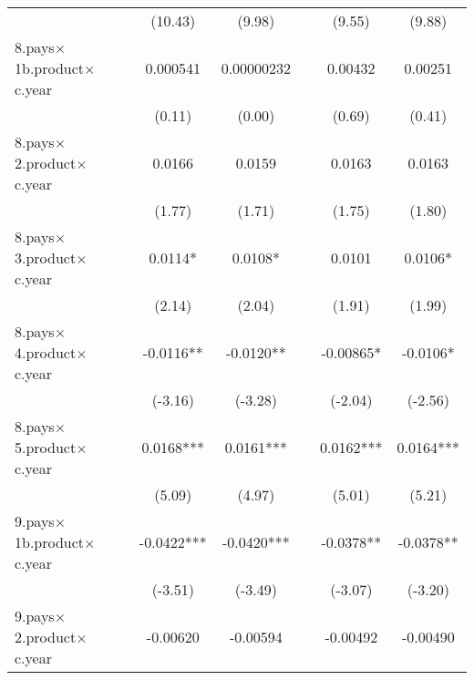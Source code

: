 {\begin{tabular}{l*{6}{c}}
                    &                     &     (10.43)         &      (9.98)         &                     &      (9.55)         &      (9.88)         \\
[1em]
8.pays$\times$1b.product$\times$c.year&                     &    0.000541         &  0.00000232         &                     &     0.00432         &     0.00251         \\
                    &                     &      (0.11)         &      (0.00)         &                     &      (0.69)         &      (0.41)         \\
[1em]
8.pays$\times$2.product$\times$c.year&                     &      0.0166         &      0.0159         &                     &      0.0163         &      0.0163         \\
                    &                     &      (1.77)         &      (1.71)         &                     &      (1.75)         &      (1.80)         \\
[1em]
8.pays$\times$3.product$\times$c.year&                     &      0.0114*  &      0.0108*  &                     &      0.0101         &      0.0106*  \\
                    &                     &      (2.14)         &      (2.04)         &                     &      (1.91)         &      (1.99)         \\
[1em]
8.pays$\times$4.product$\times$c.year&                     &     -0.0116** &     -0.0120** &                     &    -0.00865*  &     -0.0106*  \\
                    &                     &     (-3.16)         &     (-3.28)         &                     &     (-2.04)         &     (-2.56)         \\
[1em]
8.pays$\times$5.product$\times$c.year&                     &      0.0168***&      0.0161***&                     &      0.0162***&      0.0164***\\
                    &                     &      (5.09)         &      (4.97)         &                     &      (5.01)         &      (5.21)         \\
[1em]
9.pays$\times$1b.product$\times$c.year&                     &     -0.0422***&     -0.0420***&                     &     -0.0378** &     -0.0378** \\
                    &                     &     (-3.51)         &     (-3.49)         &                     &     (-3.07)         &     (-3.20)         \\
[1em]
9.pays$\times$2.product$\times$c.year&                     &    -0.00620         &    -0.00594         &                     &    -0.00492         &    -0.00490         \\

\end{tabular}}
